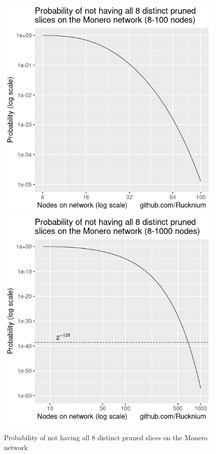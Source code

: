 \documentclass[english]{article}
\begin{document}
\begin{figure}

\caption{Probability of not having all 8 distinct pruned slices on the Monero
network}

\label{fig-pruned-node-collectors-problem}

\includegraphics[scale=0.4]{images/pruned-node-collectors-problem-to-100}\includegraphics[scale=0.4]{images/pruned-node-collectors-problem-to-1000}

\end{figure}
\end{document}
